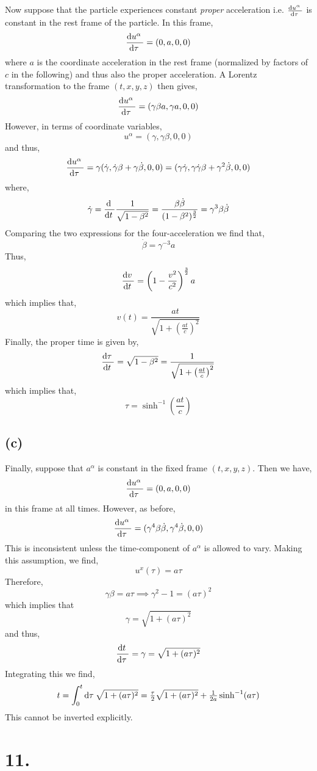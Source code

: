 \documentclass[12pt]{article}
\begin{document}
Now suppose that the particle experiences constant \textit{proper} acceleration i.e. $\frac{\mathrm{d}u^\alpha \:}{\mathrm{d}\tau \:}$ is constant in the rest frame of the particle. In this frame, 
\[ \frac{\mathrm{d}u^\alpha \:}{\mathrm{d}\tau \:} = (0, a, 0, 0) \]
where $a$ is the coordinate acceleration in the rest frame (normalized by factors of $c$ in the following) and thus also the proper acceleration. A Lorentz transformation to the frame $(t, x, y, z)$ then gives,
\[ \frac{\mathrm{d}u^\alpha \:}{\mathrm{d}\tau \:} = (\gamma \beta a, \gamma a, 0, 0)  \] 
However, in terms of coordinate variables,
\[ u^{\alpha} = (\gamma, \gamma \beta, 0, 0) \]
and thus,
\[ \frac{\mathrm{d}u^{\alpha} \:}{\mathrm{d}\tau \:} = \gamma (\dot{\gamma}, \dot{\gamma} \beta + \gamma \dot{\beta}, 0, 0) = (\gamma \dot{\gamma}, \gamma \dot{\gamma} \beta + \gamma^2 \dot{\beta}, 0, 0) \]
where,
\[ \dot{\gamma} = \frac{\mathrm{d} \:}{\mathrm{d}t \:} \frac{1}{\sqrt{1 - \beta^2}} = \frac{\beta \dot{\beta}}{(1 - \beta^2)^{\frac{3}{2}}} = \gamma^3 \beta \dot{\beta} \]
Comparing the two expressions for the four-acceleration we find that,
\[ \dot{\beta} = \gamma^{-3} a \]
Thus,
\[ \frac{\mathrm{d}v \:}{\mathrm{d}t \:} = \left(1 - \frac{v^2}{c^2} \right)^{\frac{3}{2}} a \]
which implies that,
\[ v(t) = \frac{at}{\sqrt{1 + \left( \frac{at}{c} \right)^2}}  \]
Finally, the proper time is given by,
\[ \frac{\mathrm{d}\tau \:}{\mathrm{d}t \:} = \sqrt{1 - \beta^2} = \frac{1}{\sqrt{1 + \left( \frac{at}{c} \right)^2}} \]
which implies that,
\[ \tau = \sinh^{-1}\left( \frac{at}{c} \right) \]

\subsection*{(c)}

Finally, suppose that $a^{\alpha}$ is constant in the fixed frame $(t, x, y, z)$. Then we have,
\[ \frac{\mathrm{d}u^{\alpha} \:}{\mathrm{d}\tau \:} = (0, a, 0, 0) \]
in this frame at all times. However, as before,
\[ \frac{\mathrm{d}u^\alpha \:}{\mathrm{d}\tau \:} = (\gamma^4 \beta \dot{\beta}, \gamma^4 \dot{\beta}, 0, 0) \]
This is inconsistent unless the time-component of $a^\alpha$ is allowed to vary. Making this assumption, we find,
\[ u^x(\tau) = a \tau \]
Therefore,
\[ \gamma \beta = a \tau \implies \gamma^2 - 1 = (a \tau)^2 \]
which implies that  
\[ \gamma = \sqrt{1 + (a \tau)^2} \]
and thus,
\[ \frac{\mathrm{d}t \:}{\mathrm{d}\tau \:} = \gamma = \sqrt{1 + (a \tau)^2}\]
Integrating this we find,
\[ t = \int_0^t \mathrm{d}\tau \: \sqrt{1 + (a \tau)^2} = \tfrac{\tau}{2} \sqrt{1 + (a \tau)^2} + \tfrac{1}{2 a} \sinh^{-1}(a \tau) \]
This cannot be inverted explicitly. 

\section*{11.} 
\end{document}
